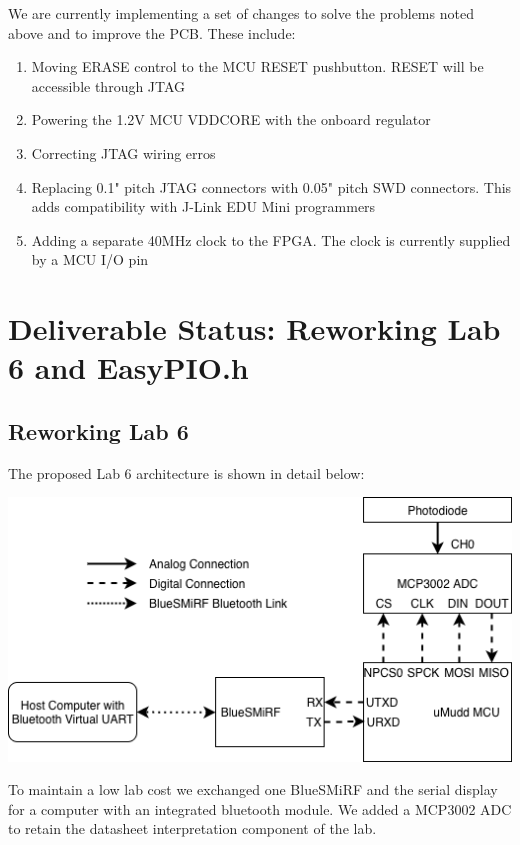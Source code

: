 \documentclass[12pt]{article}
\begin{document}
We are currently implementing a set of changes to solve the problems noted above and to improve the PCB. These include:

\begin{enumerate}
	\item Moving ERASE control to the MCU RESET pushbutton. RESET will be accessible through JTAG
	\item Powering the 1.2V MCU VDDCORE with the onboard regulator
	\item Correcting JTAG wiring erros
	\item Replacing 0.1" pitch JTAG connectors with 0.05" pitch SWD connectors. This adds compatibility with J-Link EDU Mini programmers
	\item Adding a separate 40MHz clock to the FPGA. The clock is currently supplied by a MCU I/O pin
\end{enumerate}

\newpage
\section{Deliverable Status: Reworking Lab 6 and EasyPIO.h}

\subsection{Reworking Lab 6}
The proposed Lab 6 architecture is shown in detail below:

\begin{center}
	\includegraphics[width=14cm]{blockdiagram.png}
\end{center}

To maintain a low lab cost we exchanged one BlueSMiRF and the serial display for a computer with an integrated bluetooth module. We added a MCP3002 ADC to retain the datasheet interpretation component of the lab.
\end{document}
